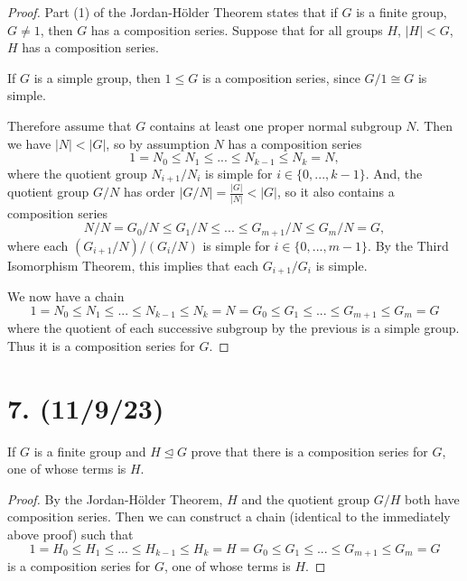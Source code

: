 \documentclass{article}
\begin{document}
\begin{proof}
    Part (1) of the Jordan-Hölder Theorem states that if $G$ is a finite group, $G \neq 1$, then $G$ has a composition series. Suppose that for all groups $H$, $|H| < G$, $H$ has a composition series.

    If $G$ is a simple group, then $1 \leq G$ is a composition series, since $G/1 \cong G$ is simple.
    
    Therefore assume that $G$ contains at least one proper normal subgroup $N$. Then we have $|N| < |G|$, so by assumption $N$ has a composition series
    \begin{equation*}
        1 = N_0 \leq N_1 \leq ... \leq N_{k - 1} \leq N_k = N,
    \end{equation*}
    where the quotient group $N_{i + 1}/N_i$ is simple for $i \in \{ 0, ..., k - 1 \}$. And, the quotient group $G/N$ has order $|G/N| = \frac{|G|}{|N|} < |G|$, so it also contains a composition series
    \begin{equation*}
        N/N = G_0/N \leq G_1/N \leq ... \leq G_{m + 1}/N \leq G_m/N = G,
    \end{equation*}
    where each $(G_{i + 1}/N)/(G_i/N)$ is simple for $i \in \{ 0, ..., m - 1 \}$. By the Third Isomorphism Theorem, this implies that each $G_{i + 1}/G_i$ is simple.

    We now have a chain
    \begin{equation*}
        1 = N_0 \leq N_1 \leq ... \leq N_{k - 1} \leq N_k = N = G_0 \leq G_1 \leq ... \leq G_{m + 1} \leq G_m = G
    \end{equation*}
    where the quotient of each successive subgroup by the previous is a simple group. Thus it is a composition series for $G$.
\end{proof}

\section*{7. (11/9/23)}

If $G$ is a finite group and $H \unlhd G$ prove that there is a composition series for $G$, one of whose terms is $H$.

\begin{proof}
    By the Jordan-Hölder Theorem, $H$ and the quotient group $G/H$ both have composition series. Then we can construct a chain (identical to the immediately above proof) such that
    \begin{equation*}
        1 = H_0 \leq H_1 \leq ... \leq H_{k - 1} \leq H_k = H = G_0 \leq G_1 \leq ... \leq G_{m + 1} \leq G_m = G
    \end{equation*}
    is a composition series for $G$, one of whose terms is $H$.
\end{proof}
\end{document}
